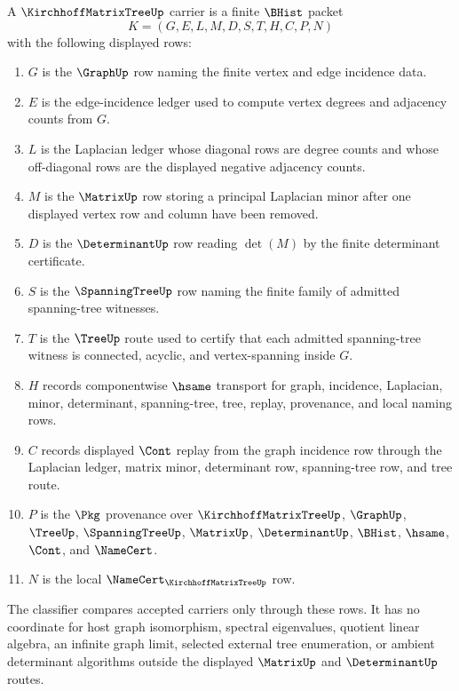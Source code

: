 \begin{definition}
\label{def:kirchhoff-matrix-tree-carrier}
A $\KirchhoffMatrixTreeUp$ carrier is a finite $\BHist$ packet
$$
K=(G,E,L,M,D,S,T,H,C,P,N)
$$
with the following displayed rows:
\begin{enumerate}
\item $G$ is the $\GraphUp$ row naming the finite vertex and edge incidence data.
\item $E$ is the edge-incidence ledger used to compute vertex degrees and adjacency counts from $G$.
\item $L$ is the Laplacian ledger whose diagonal rows are degree counts and whose off-diagonal rows are the displayed negative adjacency counts.
\item $M$ is the $\MatrixUp$ row storing a principal Laplacian minor after one displayed vertex row and column have been removed.
\item $D$ is the $\DeterminantUp$ row reading $\det(M)$ by the finite determinant certificate.
\item $S$ is the $\SpanningTreeUp$ row naming the finite family of admitted spanning-tree witnesses.
\item $T$ is the $\TreeUp$ route used to certify that each admitted spanning-tree witness is connected, acyclic, and vertex-spanning inside $G$.
\item $H$ records componentwise $\hsame$ transport for graph, incidence, Laplacian, minor, determinant, spanning-tree, tree, replay, provenance, and local naming rows.
\item $C$ records displayed $\Cont$ replay from the graph incidence row through the Laplacian ledger, matrix minor, determinant row, spanning-tree row, and tree route.
\item $P$ is the $\Pkg$ provenance over $\KirchhoffMatrixTreeUp$, $\GraphUp$, $\TreeUp$, $\SpanningTreeUp$, $\MatrixUp$, $\DeterminantUp$, $\BHist$, $\hsame$, $\Cont$, and $\NameCert$.
\item $N$ is the local $\NameCert_{\KirchhoffMatrixTreeUp}$ row.
\end{enumerate}
The classifier compares accepted carriers only through these rows. It has no coordinate for host graph isomorphism, spectral eigenvalues, quotient linear algebra, an infinite graph limit, selected external tree enumeration, or ambient determinant algorithms outside the displayed $\MatrixUp$ and $\DeterminantUp$ routes.
\end{definition}

